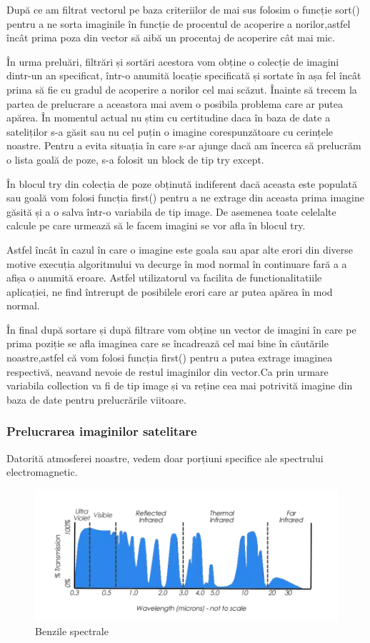 \documentclass[12pt,a4paper]{article}
\theoremstyle{definition}
\theoremstyle{remark}
\begin{document}
După ce am filtrat vectorul pe baza criteriilor de mai sus folosim o funcție sort() pentru a ne sorta imaginile în funcție de procentul de acoperire a norilor,astfel încât prima poza din vector să aibă un procentaj de acoperire cât mai mic.

În urma preluări, filtrări și sortări acestora vom obține o colecție de imagini dintr-un an specificat, într-o anumită locație specificată și sortate în așa fel încât prima să fie cu gradul de acoperire a norilor cel mai scăzut. Înainte să trecem la partea de prelucrare a aceastora mai avem o posibila problema care ar putea apărea. În momentul actual nu știm cu certitudine daca în baza de date a sateliților s-a găsit sau nu cel puțin o imagine corespunzătoare cu cerințele noastre. Pentru a evita situația în care s-ar ajunge dacă am încerca să prelucrăm o lista goală de poze, s-a folosit un block de tip try except.

În blocul try din colecția de poze obținută indiferent dacă aceasta este populată sau goală vom folosi funcția first() pentru a ne extrage din aceasta prima imagine găsită și a o salva într-o variabila de tip image. De asemenea toate celelalte calcule pe care urmează să le facem imagini se vor afla în blocul try. 

Astfel încât în cazul în care o imagine este goala sau apar alte erori din diverse motive execuția algoritmului va decurge în mod normal în continuare fară a a afișa o anumită eroare. Astfel utilizatorul va facilita de functionalitatiile aplicației, ne find întrerupt de posibilele erori care ar putea apărea în mod normal.

În final după sortare și după filtrare vom obține un vector de imagini în care pe prima poziție se afla imaginea care se încadrează cel mai bine în căutările noastre,astfel că vom folosi funcția first() pentru a putea extrage imaginea respectivă, neavand nevoie de restul imaginilor din vector.Ca prin urmare variabila collection va fi de tip image și va reține cea mai potrivită imagine din baza de date pentru prelucrările viitoare.

\subsubsection{Prelucrarea imaginilor satelitare}

Datorită atmosferei noastre, vedem doar porțiuni specifice ale spectrului electromagnetic.

\begin{figure}[H]
  \centering
  \includegraphics[width=400pt]{benzispectralePNG.PNG}
  \caption{Benzile spectrale \cite{benzi}}   
\end{figure}
\end{document}
